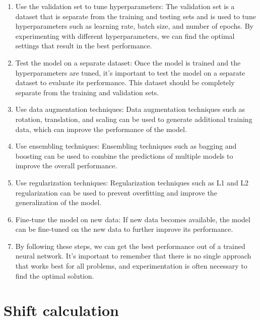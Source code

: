         \begin{enumerate}
            \item Use the validation set to tune hyperparameters: The validation set is a dataset that is separate
            from the training and testing sets and is used to tune hyperparameters such as learning rate, batch size,
            and number of epochs. By experimenting with different hyperparameters, we can find the optimal settings
            that result in the best performance.
            \item Test the model on a separate dataset: Once the model is trained and the hyperparameters are tuned,
            it's important to test the model on a separate dataset to evaluate its performance. This dataset should be
            completely separate from the training and validation sets.
            \item Use data augmentation techniques: Data augmentation techniques such as rotation, translation, and
            scaling can be used to generate additional training data, which can improve the performance of the model.
            \item Use ensembling techniques: Ensembling techniques such as bagging and boosting can be used to
            combine the predictions of multiple models to improve the overall performance.
            \item Use regularization techniques: Regularization techniques such as L1 and L2 regularization
            can be used to prevent overfitting and improve the generalization of the model.
            \item Fine-tune the model on new data: If new data becomes available, the model can be fine-tuned on the
            new data to further improve its performance.
            \item By following these steps, we can get the best performance out of a trained neural network.
            It's important to remember that there is no single approach that works best for all problems, and
            experimentation is often necessary to find the optimal solution.
        \end{enumerate}
    \section{Shift calculation} \label{sec:shiftcalc}
